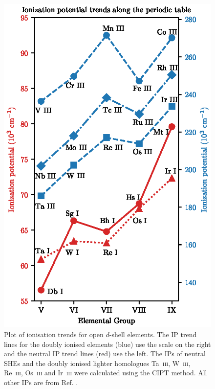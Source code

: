 \documentclass[10pt,a4paper, twoside, openright]{report}
\begin{document}
\begin{figure}
\centering
\includegraphics[scale=1.20]{./figures/Ionization_Plot.eps}
\caption[Ionisation trends for open $d$-shell elements.]{Plot of ionisation trends for open $d$-shell elements. The IP trend lines for the doubly ionised elements (blue) use the scale on the right and the neutral IP trend lines (red) use the left. The IPs of neutral SHEs and the doubly ionised lighter homologues Ta~\textsc{iii}, W~\textsc{iii}, Re~\textsc{iii}, Os~\textsc{iii} and Ir~\textsc{iii} were calculated using the CIPT method. All other IPs are from Ref. \cite{NIST_ASD}. \label{fig:IPPlot}}
\end{figure}
\end{document}
